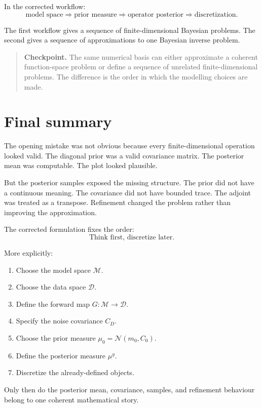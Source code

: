 \documentclass[11pt,a4paper]{book}
\newenvironment{checkpoint}
  {\begin{quote}\textbf{Checkpoint.}}
  {\end{quote}}
\newcommand{\M}{\mathcal{M}}      %
\newcommand{\D}{\mathcal{D}}      %
\newcommand{\prior}{\mu_0}
\newcommand{\post}{\mu^y}
\newcommand{\G}{G}
\begin{document}
In the corrected workflow:
\[
    \text{model space}
    \Rightarrow
    \text{prior measure}
    \Rightarrow
    \text{operator posterior}
    \Rightarrow
    \text{discretization}.
\]

The first workflow gives a sequence of finite-dimensional Bayesian problems.
The second gives a sequence of approximations to one Bayesian inverse problem.

\begin{checkpoint}
The same numerical basis can either approximate a coherent function-space
problem or define a sequence of unrelated finite-dimensional problems.
The difference is the order in which the modelling choices are made.
\end{checkpoint}

\section{Final summary}

The opening mistake was not obvious because every finite-dimensional operation
looked valid. The diagonal prior was a valid covariance matrix. The posterior
mean was computable. The plot looked plausible.

But the posterior samples exposed the missing structure. The prior did not have
a continuous meaning. The covariance did not have bounded trace. The adjoint was
treated as a transpose. Refinement changed the problem rather than improving the
approximation.

The corrected formulation fixes the order:
\[
    \boxed{
    \text{Think first, discretize later.}
    }
\]

More explicitly:
\begin{enumerate}[label=\arabic*.]
    \item Choose the model space $\M$.
    \item Choose the data space $\D$.
    \item Define the forward map $\G:\M\to\D$.
    \item Specify the noise covariance $C_D$.
    \item Choose the prior measure $\prior=\mathcal{N}(m_0,C_0)$.
    \item Define the posterior measure $\post$.
    \item Discretize the already-defined objects.
\end{enumerate}

Only then do the posterior mean, covariance, samples, and refinement behaviour
belong to one coherent mathematical story.
\end{document}
